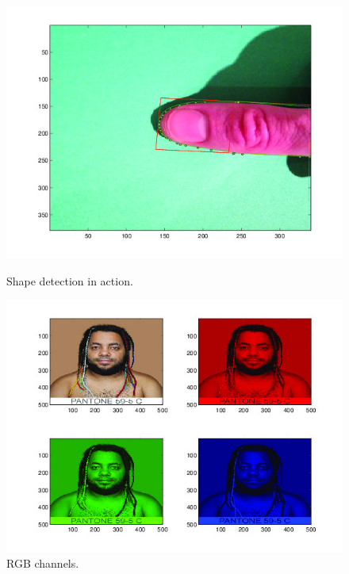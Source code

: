 \begin{figure}[h!]
  \centering
    \includegraphics[width=\textwidth]{Chapter4/Figs/shapeDetection.jpg}\label{fig:shapeDetection}
    \caption{Shape detection in action.}
\end{figure}

\begin{figure}[h!]
  \centering
    \includegraphics[width=\textwidth]{Chapter4/Figs/rainbowmanRGB.jpg}
    \caption{RGB channels.}
\end{figure}


